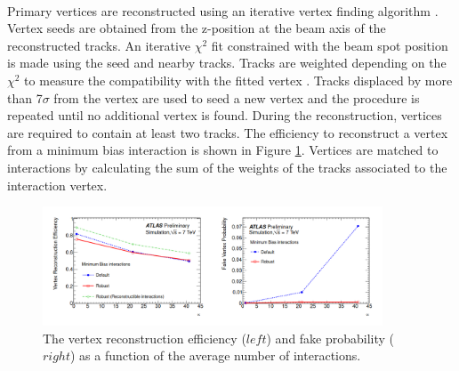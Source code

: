 \\
Primary vertices are reconstructed using an iterative vertex finding algorithm \cite{Vrtx_Eff}. Vertex seeds are obtained from the z-position at the beam axis of the reconstructed tracks. An iterative $\chi^2$ fit constrained with the beam spot position is made using the seed and nearby tracks. Tracks are weighted depending on the $\chi^2$ to measure the compatibility with the fitted vertex \cite{chi2}. Tracks displaced by more than 7$\sigma$ from the vertex are used to seed a new vertex and the procedure is repeated until no additional vertex is found. During the reconstruction, vertices are required to contain at least two tracks. The efficiency to reconstruct a vertex from a minimum bias interaction is shown in Figure \ref{fig:chap2:Objects:Vtx:Eff}. Vertices are matched to interactions by calculating the sum of the weights of the tracks associated to the interaction vertex. 
\begin{figure}[htbp]
    \centering
    \includegraphics[width=0.9\textwidth]{Ch2/Img/Vtx_Reco_Eff.png}
    \caption{The vertex reconstruction efficiency ($left$) and fake probability ($right$) as a function of the average number of interactions.}
    \label{fig:chap2:Objects:Vtx:Eff}
\end{figure}

